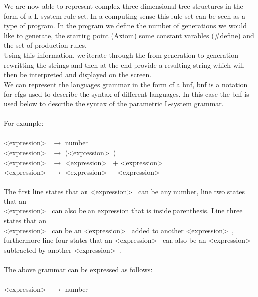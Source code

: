 We are now able to represent complex three dimensional tree structures in the form of a L-system rule set. In a computing sense this rule set can be seen as a type of program. In the program we define the number of generations we would like to generate, the starting point (Axiom) some constant varables (\#define) and the set of production rules. \\
Using this information, we iterate through the from generation to generation rewritting the strings and then at the end provide a resulting string which will then be interpreted and displayed on the screen.
\\
We can represent the languages grammar in the form of a \acrlong{bnf}, \acrshort{bnf} is a notation for \acrlong{cfg}s used to describe the syntax of different languages. In this case the \acrshort{bnf} is used below to describe the syntax of the parametric L-system grammar. \\
\\
For example: \\ 
\\
\textless expression\textgreater~ $\rightarrow$ number \\ 
\textless expression\textgreater~ $\rightarrow$ (\textless expression\textgreater~) \\
\textless expression\textgreater~ $\rightarrow$ \textless expression\textgreater~ + \textless expression\textgreater~ \\
\textless expression\textgreater~ $\rightarrow$ \textless expression\textgreater~ - \textless expression\textgreater~ \\
\\
The first line states that an \textless expression\textgreater~ can be any number, line two states that an \\ \textless expression\textgreater~ can also be an expression that is inside parenthesis. Line three states that an \\ \textless expression\textgreater~ can be an \textless expression\textgreater~ added to another \textless expression\textgreater~, furthermore line four states that an \textless expression\textgreater~ can also be an \textless expression\textgreater~ subtracted by another \textless expression\textgreater~. \\
\\
The above grammar can be expressed as follows: \\
\\
\textless expression\textgreater~ $\rightarrow$ number 

